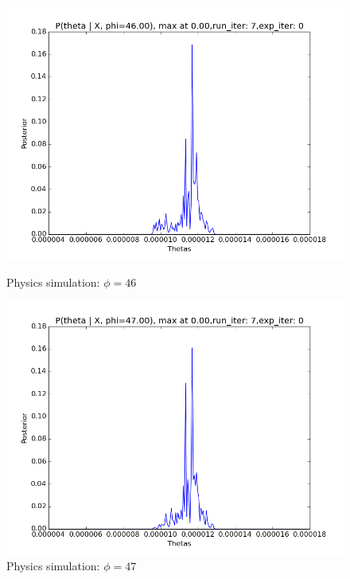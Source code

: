 \documentclass[10pt,journal,compsoc]{IEEEtran}
\begin{document}
\begin{figure}[ht!]
\begin{minipage}[b]{0.5\linewidth}
\includegraphics[width=1\linewidth]{PhysicsPlots/LP6.png} 
\caption{\label{fig:LP6}Physics simulation: $\phi=46$}
\vspace{1ex}
\end{minipage} 		
\begin{minipage}[b]{0.5\linewidth}
\centering
\includegraphics[width=1\linewidth]{PhysicsPlots/LP7.png} 
\caption{\label{fig:LP7}Physics simulation: $\phi=47$}
\vspace{1ex}
\end{minipage} 
\begin{minipage}[b]{0.5\linewidth}
\centering

\end{minipage}
\end{figure}
\end{document}
